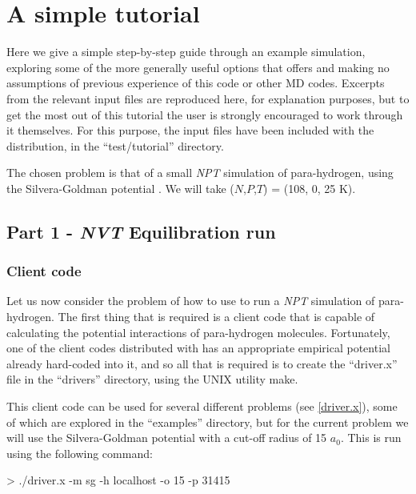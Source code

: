 \documentclass[11pt,english,fleqn]{report}
\newenvironment{code}{%
\footnotesize 
\verbatim
}{
\endverbatim
\normalsize
}
\begin{document}
\chapter{A simple tutorial}

\label{tutorial}

Here we give a simple step-by-step guide through an example
simulation, exploring
some of the more generally useful options that \ipi offers and making
no assumptions of previous experience of this code or other MD codes.
Excerpts from the relevant input files are reproduced here, for explanation
purposes, but to get the most out of this tutorial the user is strongly encouraged
to work through it themselves. For this purpose, the input files
have been included with the \ipi distribution, in the {}``test/tutorial''
directory.

The chosen problem is that of a small \emph{NPT} simulation of para-hydrogen, 
using the Silvera-Goldman potential \cite{silv-gold78jcp}. 
We will take (\(N\),\(P\),\(T\)) = (108, 0, 25 K).

\section{Part 1 - \emph{NVT} Equilibration run}

\label{part1}

\subsection{Client code}

Let us now consider the problem of how to use \ipi to run a \emph{NPT}
simulation of para-hydrogen. The first thing that is required is a
client code that is capable of calculating the potential interactions
of para-hydrogen molecules. Fortunately, one of the client codes distributed
with \ipi has an appropriate empirical potential already hard-coded
into it, and
so all that is required is to create the {}``driver.x'' file in
the {}``drivers'' directory, using the UNIX utility make.

This client code can be used for several different problems
(see \ref{driver.x}), some of which
are explored in the {}``examples'' directory, but for the current problem
we will use the Silvera-Goldman potential with a cut-off radius
of 15 \(a_0\). This is run using the following command:

\begin{code}
> ./driver.x -m sg -h localhost -o 15 -p 31415
\end{code}
\end{document}
